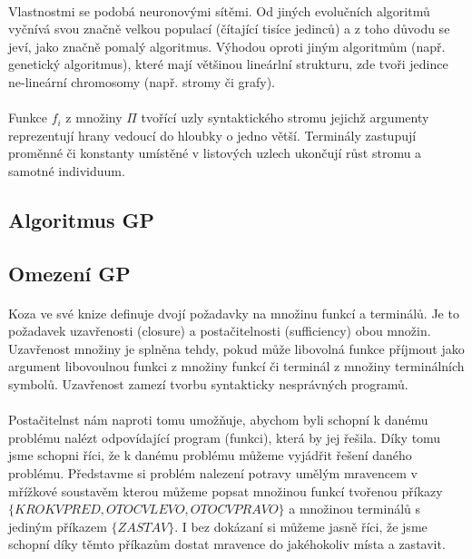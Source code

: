 \documentclass[bc,male,java,dept460]{diploma}		%
\begin{document}
\paragraph*{}
Vlastnostmi se podobá neuronovými sítěmi. Od jiných evolučních algoritmů vyčnívá svou značně velkou populací (čítající tisíce jedinců) a z toho důvodu se jeví, jako značně pomalý algoritmus. Výhodou oproti jiným algoritmům (např. genetický algoritmus), které mají většinou lineárlní strukturu, zde tvoři jedince ne-lineární chromosomy (např. stromy či grafy).
\paragraph*{}
Funkce $f_i$ z množiny $\Pi$ tvořící uzly syntaktického stromu jejichž argumenty reprezentují hrany vedoucí do hloubky o jedno větší. Terminály zastupují proměnné či konstanty umístěné v listových uzlech ukončují růst stromu a samotné individuum.

\subsection{Algoritmus GP}

\subsection{Omezení GP}
\paragraph*{}
Koza ve své knize definuje \cite{kozagp} dvojí požadavky na množinu funkcí a terminálů. Je to požadavek uzavřenosti (closure) a postačitelnosti (sufficiency) obou množin. Uzavřenost množiny je splněna tehdy, pokud může libovolná funkce příjmout jako argument libovoulnou funkci z množiny funkcí či terminál z množiny terminálních symbolů. Uzavřenost zamezí tvorbu syntakticky nesprávných programů.
\paragraph*{}
Postačitelnst nám naproti tomu umožňuje, abychom byli schopní k danému problému nalézt odpovídající program (funkci), která by jej řešila. Díky tomu jsme schopni říci, že k danému problému můžeme vyjádřit řešení daného problému. Představme si problém nalezení potravy umělým mravencem v mřížkové soustavěm kterou můžeme popsat množinou funkcí tvořenou příkazy $\{KROK VPRED, OTOC VLEVO, OTOC VPRAVO\}$ a množinou terminálů s jediným příkazem $\{ZASTAV\}$. I bez dokázaní si můžeme jasně říci, že jsme schopní díky těmto příkazům dostat mravence do jakéhokoliv místa a zastavit.
\end{document}
